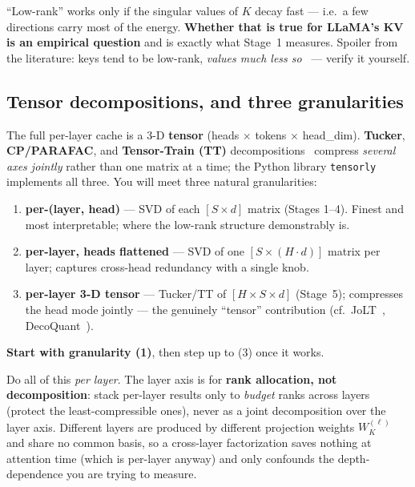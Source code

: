 \documentclass[11pt]{article}
\newcommand{\term}[1]{\textbf{\color{accent!85!black}#1}}
\newcommand{\code}[1]{\texttt{\small #1}}
\begin{document}
\begin{keybox}
``Low-rank'' works only if the singular values of $K$ decay fast --- i.e.\ a few directions
carry most of the energy. \textbf{Whether that is true for LLaMA's KV is an empirical question}
and is exactly what Stage~1 measures. Spoiler from the literature: keys tend to be low-rank,
\emph{values much less so}~\cite{shadowkv} --- verify it yourself.
\end{keybox}

\subsection{Tensor decompositions, and three granularities}
The full per-layer cache is a 3-D \term{tensor} (heads $\times$ tokens $\times$ head\_dim).
\term{Tucker}, \term{CP/PARAFAC}, and \term{Tensor-Train (TT)} decompositions~\cite{kolda,tt}
compress \emph{several axes jointly} rather than one matrix at a time; the Python library
\code{tensorly} implements all three. You will meet three natural granularities:
\begin{enumerate}[leftmargin=1.6em,itemsep=1pt]
\item \term{per-(layer, head)} --- SVD of each $[S\times d]$ matrix (Stages 1--4). Finest and most interpretable; where the low-rank structure demonstrably is.
\item \term{per-layer, heads flattened} --- SVD of one $[S\times (H\cdot d)]$ matrix per layer; captures cross-head redundancy with a single knob.
\item \term{per-layer 3-D tensor} --- Tucker/TT of $[H\times S\times d]$ (Stage~5); compresses the head mode jointly --- the genuinely ``tensor'' contribution (cf.\ JoLT~\cite{jolt}, DecoQuant~\cite{decoquant}).
\end{enumerate}
\textbf{Start with granularity (1)}, then step up to (3) once it works.

\begin{keybox}
Do all of this \emph{per layer}. The layer axis is for \textbf{rank allocation, not decomposition}:
stack per-layer results only to \emph{budget} ranks across layers (protect the least-compressible
ones), never as a joint decomposition over the layer axis. Different layers are produced by
different projection weights $W_K^{(\ell)}$ and share no common basis, so a cross-layer
factorization saves nothing at attention time (which is per-layer anyway) and only confounds the
depth-dependence you are trying to measure.
\end{keybox}
\end{document}
